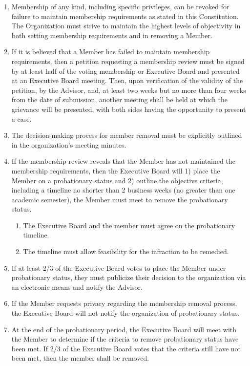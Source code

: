 \documentclass[11pt]{article}
\newcounter{articlect}
\newcommand{\carticle}[1]{\stepcounter{articlect} \vskip 11pt \noindent \textbf{\underline{\smash{Article \Roman{articlect} - #1}}}\par}
\begin{document}
\carticle{Member Removal}
\begin{enumerate}
\item Membership of any kind, including specific privileges, can be revoked for failure to maintain membership requirements as stated in this Constitution. The Organization must strive to maintain the highest levels of objectivity in both setting membership requirements and in removing a Member.
\item If it is believed that a Member has failed to maintain membership requirements, then a petition requesting a membership review must be signed by at least half of the voting membership or Executive Board and presented at an Executive Board meeting.  Then, upon verification of the validity of the petition, by the Advisor, and, at least two weeks but no more than four weeks from the date of submission, another meeting shall be held at which the grievance will be presented, with both sides having the opportunity to present a case.
\item The decision-making process for member removal must be explicitly outlined in the organization’s meeting minutes.
\item If the membership review reveals that the Member has not maintained the membership requirements, then the Executive Board will 1) place the Member on a probationary status and 2) outline the objective criteria, including a timeline no shorter than 2 business weeks (no greater than one academic semester), the Member must meet to remove the probationary status.
\begin{enumerate}
\item The Executive Board and the member must agree on the probationary timeline.
\item The timeline must allow feasibility for the infraction to be remedied.
\end{enumerate}
\item If at least 2/3 of the Executive Board votes to place the Member under probationary status, they must publicize their decision to the organization via an electronic means and notify the Advisor.
\item If the Member requests privacy regarding the membership removal process, the Executive Board will not notify the organization of probationary status.
\item At the end of the probationary period, the Executive Board will meet with the Member to determine if the criteria to remove probationary status have been met. If 2/3 of the Executive Board votes that the criteria still have not been met, then the member shall be removed.

\end{enumerate}
\end{document}
